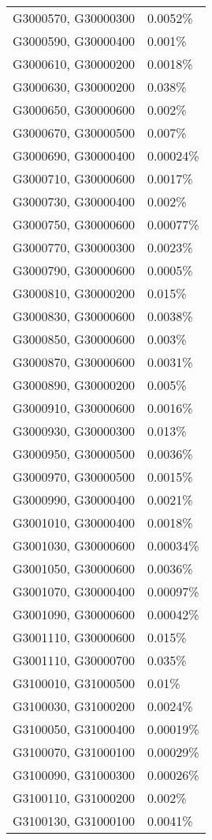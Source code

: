 \begin{longtable}[]{@{}ll@{}}
G3000570, G30000300 & 0.0052\% \\
G3000590, G30000400 & 0.001\% \\
G3000610, G30000200 & 0.0018\% \\
G3000630, G30000200 & 0.038\% \\
G3000650, G30000600 & 0.002\% \\
G3000670, G30000500 & 0.007\% \\
G3000690, G30000400 & 0.00024\% \\
G3000710, G30000600 & 0.0017\% \\
G3000730, G30000400 & 0.002\% \\
G3000750, G30000600 & 0.00077\% \\
G3000770, G30000300 & 0.0023\% \\
G3000790, G30000600 & 0.0005\% \\
G3000810, G30000200 & 0.015\% \\
G3000830, G30000600 & 0.0038\% \\
G3000850, G30000600 & 0.003\% \\
G3000870, G30000600 & 0.0031\% \\
G3000890, G30000200 & 0.005\% \\
G3000910, G30000600 & 0.0016\% \\
G3000930, G30000300 & 0.013\% \\
G3000950, G30000500 & 0.0036\% \\
G3000970, G30000500 & 0.0015\% \\
G3000990, G30000400 & 0.0021\% \\
G3001010, G30000400 & 0.0018\% \\
G3001030, G30000600 & 0.00034\% \\
G3001050, G30000600 & 0.0036\% \\
G3001070, G30000400 & 0.00097\% \\
G3001090, G30000600 & 0.00042\% \\
G3001110, G30000600 & 0.015\% \\
G3001110, G30000700 & 0.035\% \\
G3100010, G31000500 & 0.01\% \\
G3100030, G31000200 & 0.0024\% \\
G3100050, G31000400 & 0.00019\% \\
G3100070, G31000100 & 0.00029\% \\
G3100090, G31000300 & 0.00026\% \\
G3100110, G31000200 & 0.002\% \\
G3100130, G31000100 & 0.0041\% \\

\end{longtable}
